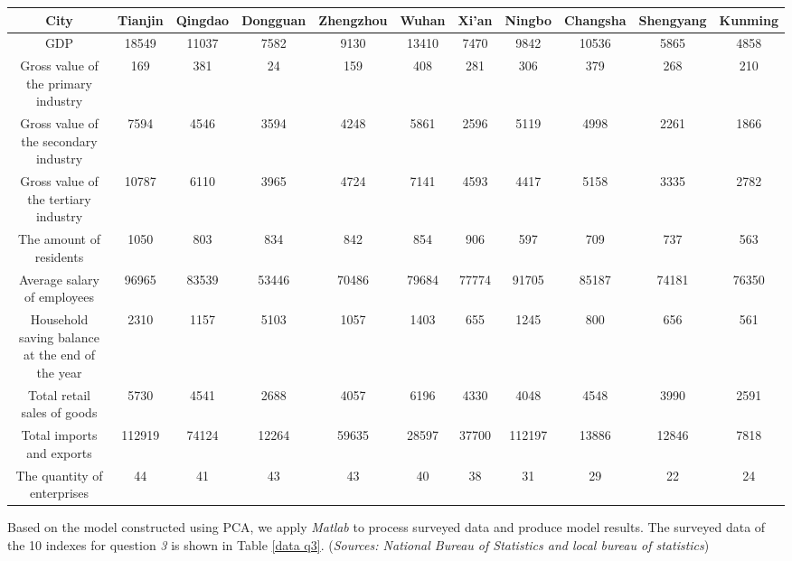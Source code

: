 \documentclass{apmcmthesis}
\begin{document}
\begin{table}[h]
\tiny
\centering
    \begin{tabular}{ccccccccccc}
    \toprule
    City  & Tianjin & Qingdao & Dongguan & Zhengzhou & Wuhan & Xi'an & Ningbo & Changsha & Shengyang & Kunming \\
    \midrule
    GDP &  18549  & 11037  & 7582  & 9130  & 13410  & 7470  & 9842  & 10536  & 5865  & 4858  \\
    \midrule
    Gross value of the primary industry &  169   & 381   & 24    & 159   & 408   & 281   & 306   & 379   & 268   & 210  \\
    \midrule
    Gross value of the secondary industry & 7594  & 4546  & 3594  & 4248  & 5861  & 2596  & 5119  & 4998  & 2261  & 1866  \\
    \midrule
    Gross value of the tertiary industry   & 10787  & 6110  & 3965  & 4724  & 7141  & 4593  & 4417  & 5158  & 3335  & 2782  \\
    \midrule
    The amount of residents &  1050  & 803   & 834   & 842   & 854   & 906   & 597   & 709   & 737   & 563  \\
    \midrule
    Average salary of employees &  96965  & 83539  & 53446  & 70486  & 79684  & 77774  & 91705  & 85187  & 74181  & 76350  \\
    \midrule
    Household saving balance at the end of the year &  2310  & 1157  & 5103  & 1057  & 1403  & 655   & 1245  & 800   & 656   & 561  \\
    \midrule
    Total retail sales of goods &  5730  & 4541  & 2688  & 4057  & 6196  & 4330  & 4048  & 4548  & 3990  & 2591  \\
    \midrule
    Total imports and exports &  112919  & 74124  & 12264  & 59635  & 28597  & 37700  & 112197  & 13886  & 12846  & 7818  \\
    \midrule
    The quantity of enterprises &  44  & 41  & 43  & 43  & 40 & 38  & 31  & 29  & 22  & 24  \\
    \bottomrule
    \end{tabular}
\end{table}
Based on the model constructed using PCA, we apply \textit {Matlab} to process surveyed data and produce model results. The surveyed data of the 10 indexes for question \textit{3} is shown in Table \ref{data q3}. (\textit{Sources: National Bureau of Statistics and local bureau of statistics})
\end{document}
